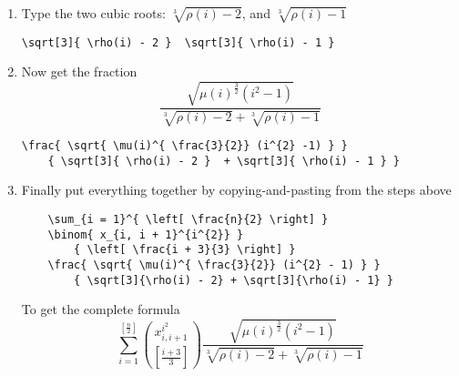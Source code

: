 \begin{enumerate}
\begin{verbatim}
    \end{verbatim}
    Then add the square root $\sqrt{ \mu(i)^{ \frac{3}{2} } (i^{2} - 1) }$
    \begin{verbatim}
\sqrt{ \mu(i)^{ \frac{3}{2} } (i^{2} - 1) }    
    \end{verbatim}
    \item Type the two cubic roots: $\sqrt[3]{ \rho(i) - 2 }$, and $\sqrt[3]{ \rho(i) - 1 }$
    \begin{verbatim}
\sqrt[3]{ \rho(i) - 2 }  \sqrt[3]{ \rho(i) - 1 }
    \end{verbatim}
    \item Now get the fraction
    \[
    \frac{ \sqrt{ \mu(i)^{ \frac{3}{2}} (i^{2} -1) } }
        { \sqrt[3]{ \rho(i) - 2 }  + \sqrt[3]{ \rho(i) - 1 } }
    \]
    \begin{verbatim}
\frac{ \sqrt{ \mu(i)^{ \frac{3}{2}} (i^{2} -1) } }
    { \sqrt[3]{ \rho(i) - 2 }  + \sqrt[3]{ \rho(i) - 1 } }
    \end{verbatim}
    \item Finally put everything together by copying-and-pasting from the steps above
    \begin{verbatim}
    \sum_{i = 1}^{ \left[ \frac{n}{2} \right] }
    \binom{ x_{i, i + 1}^{i^{2}} }
        { \left[ \frac{i + 3}{3} \right] }
    \frac{ \sqrt{ \mu(i)^{ \frac{3}{2}} (i^{2} - 1) } }
        { \sqrt[3]{\rho(i) - 2} + \sqrt[3]{\rho(i) - 1} }
    \end{verbatim}
    To get the complete formula
    \[
    \sum_{i = 1}^{ \left[ \frac{n}{2} \right] }
    \binom{ x_{i, i + 1}^{i^{2}} }
        { \left[ \frac{i + 3}{3} \right] }
    \frac{ \sqrt{ \mu(i)^{ \frac{3}{2}} (i^{2} - 1) } }
        { \sqrt[3]{\rho(i) - 2} + \sqrt[3]{\rho(i) - 1} }
    \]
\end{enumerate}
